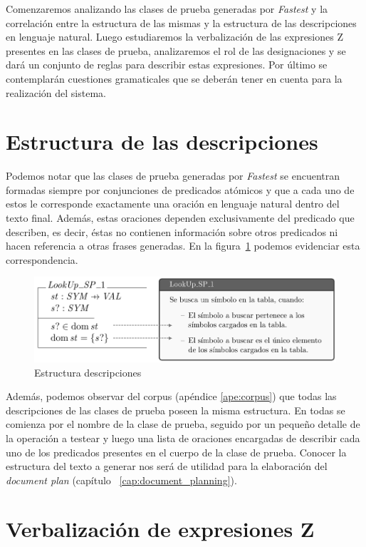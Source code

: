 Comenzaremos analizando las clases de prueba generadas por \emph{Fastest} y la correlación entre la estructura de las mismas y la estructura de las descripciones en lenguaje natural. Luego estudiaremos la verbalización de las expresiones Z presentes en las clases de prueba, analizaremos el rol de las designaciones y se dará un conjunto de reglas para describir estas expresiones. Por último se contemplarán cuestiones gramaticales que se deberán tener en cuenta para la realización del sistema.

\section{Estructura de las descripciones}
\label{sec:corpus_descripciones}
Podemos notar que las clases de prueba generadas por \emph{Fastest} se encuentran formadas siempre por conjunciones de predicados atómicos y que a cada uno de estos le corresponde exactamente una oración en lenguaje natural dentro del texto final. Además, estas oraciones dependen exclusivamente del predicado que describen, es decir, éstas no contienen información sobre otros predicados ni hacen referencia a otras frases generadas. En la figura~\ref{fig:ej_test_desc} podemos evidenciar esta correspondencia.

\begin{figure}[H]
\centering
\includegraphics[scale=0.4]{img/ej_test_desc.png}
\caption{Estructura descripciones}
\label{fig:ej_test_desc}
\end{figure}

Además, podemos observar del corpus (apéndice \ref{ape:corpus}) que todas las descripciones de las clases de prueba poseen la misma estructura. En todas se comienza por el nombre de la clase de prueba, seguido por un pequeño detalle de la operación a testear y luego una lista de oraciones encargadas de describir cada uno de los predicados presentes en el cuerpo de la clase de prueba. Conocer la estructura del texto a generar nos será de utilidad para la elaboración del \emph{document plan} (capítulo ~\ref{cap:document_planning}).

\section{Verbalización de expresiones Z}
\label{sec:corpus_verbalizacion}

